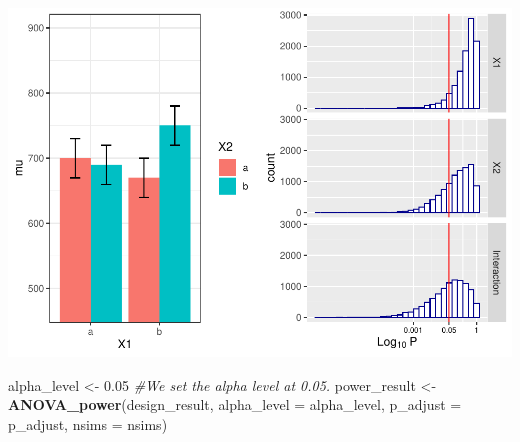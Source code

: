 \documentclass[]{book}
\newenvironment{Shaded}{\begin{snugshade}}{\end{snugshade}}
\newcommand{\CommentTok}[1]{\textcolor[rgb]{0.56,0.35,0.01}{\textit{#1}}}
\newcommand{\DataTypeTok}[1]{\textcolor[rgb]{0.13,0.29,0.53}{#1}}
\newcommand{\FloatTok}[1]{\textcolor[rgb]{0.00,0.00,0.81}{#1}}
\newcommand{\KeywordTok}[1]{\textcolor[rgb]{0.13,0.29,0.53}{\textbf{#1}}}
\newcommand{\NormalTok}[1]{#1}
\newcommand{\StringTok}[1]{\textcolor[rgb]{0.31,0.60,0.02}{#1}}
\begin{document}
\includegraphics{SuperpowerValidation_files/figure-latex/unnamed-chunk-64-1.pdf}

\begin{Shaded}
\begin{Highlighting}[]
\NormalTok{alpha_level <-}\StringTok{ }\FloatTok{0.05}
\CommentTok{#We set the alpha level at 0.05. }
\NormalTok{power_result <-}\StringTok{ }\KeywordTok{ANOVA_power}\NormalTok{(design_result, }
                            \DataTypeTok{alpha_level =}\NormalTok{ alpha_level, }
                            \DataTypeTok{p_adjust =}\NormalTok{ p_adjust,}
                            \DataTypeTok{nsims =}\NormalTok{ nsims)}
\end{Highlighting}
\end{Shaded}
\end{document}
